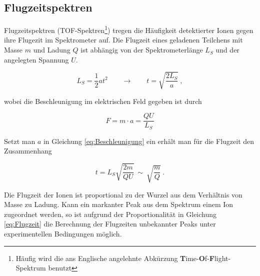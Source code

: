 \subsection{Flugzeitspektren}

Flugzeitspektren (TOF-Spektren\footnote{Häufig wird die ans Englische angelehnte Abkürzung \textbf{T}ime-\textbf{O}f-\textbf{F}light-Spektrum benutzt}) tregen die Häufigkeit detektierter Ionen gegen ihre Flugezit im Spektrometer auf. Die Flugzeit eines geladenen Teilchens mit Masse $m$ und Ladung $Q$ ist abhängig von der Spektrometerlänge $L_S$ und der angelegten Spannung $U$.

\begin{equation} \label{eq:Beschleunigung}
L_S = \frac{1}{2}at^2\qquad \rightarrow \qquad t = \sqrt{\frac{2L_S}{a}} \: ,
\end{equation} 

wobei die Beschleunigung im elektrischen Feld gegeben ist durch

\begin{equation}
F = m \cdot a = \frac{QU}{L_S}
\end{equation}

Setzt man $a$ in Gleichung \ref{eq:Beschleunigung} ein erhält man für die Flugzeit den Zusammenhang 

\begin{equation} \label{eq:Flugzeit}
t = L_S \sqrt{\frac{2m}{QU}}\: \sim \: \sqrt{\frac{m}{Q}} \: .
\end{equation}

Die Flugzeit der Ionen ist proportional zu der Wurzel aus dem Verhältnis von Masse zu Ladung. Kann ein markanter Peak aus dem Spektrum einem Ion zugeordnet werden, so ist aufgrund der Proportionalität in Gleichung \ref{eq:Flugzeit} die Berechnung der Flugzeiten unbekannter Peaks unter experimentellen Bedingungen möglich. %

